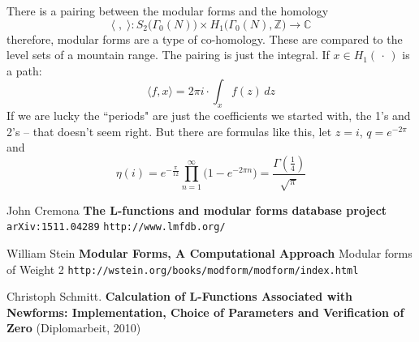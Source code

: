 \documentclass[12pt]{article}
\begin{document}
\noindent There is a pairing between the modular forms and the homology
$$  \langle \; , \;  \rangle : S_2 \big( \Gamma_0(N) \big) \times H_1 \big( \Gamma_0(N) , \mathbb{Z} \big) \to \mathbb{C}$$
therefore, modular forms are a type of co-homology.  These are compared to the level sets of a mountain range.  The pairing is just the integral.  If $x \in H_1( \, \cdot \, )$ is a path:
$$ \langle f, x \rangle = 2\pi i \cdot \int_x f(z) \, dz $$
If we are lucky the ``periods" are just the coefficients we started with, the 1's and 2's -- that doesn't seem right.  But there are formulas like this, let $z = i$, $q = e^{-2\pi}$ and 
$$ \eta(i) =  e^{-\frac{\pi}{12}} \prod_{n=1}^\infty \big( 1 - e^{-2\pi n} \big) = \frac{\Gamma(\frac{1}{4})}{\sqrt{\pi}} $$

\vfill

\selectfont \fontsize{12}{10}\selectfont

\begin{thebibliography}{}

\item John Cremona \textbf{The L-functions and modular forms database project}  \texttt{arXiv:1511.04289}  
\texttt{http://www.lmfdb.org/}

\item William Stein \textbf{Modular Forms, A Computational Approach} Modular forms of Weight 2 \texttt{http://wstein.org/books/modform/modform/index.html}

\item Christoph Schmitt. \textbf{Calculation of L-Functions Associated with
Newforms: Implementation, Choice of
Parameters and Verification of Zero} (Diplomarbeit, 2010)

\end{thebibliography}

\end{document}
